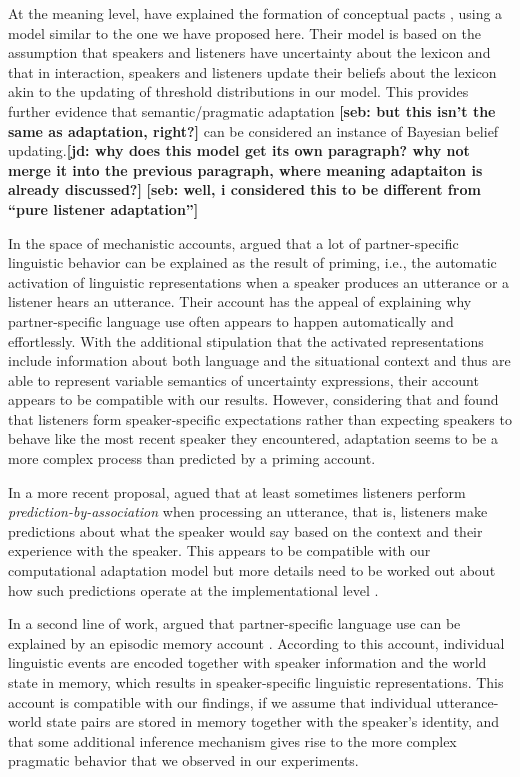 \documentclass[man, floatsintext]{apa6}
\newcommand{\jd}[1]{\textcolor{PinkyPurple}{\textbf{[jd: #1]}}}
\newcommand{\seb}[1]{}
\renewcommand{\seb}[1]{{\bf \color{red} [seb: {#1}]}}
\begin{document}
At the meaning level, \textcite{Hawkins2017} have explained the formation of conceptual pacts \parencite{Clark1986},
 using a model  similar to the one we have proposed here. 
Their model is based on the assumption that speakers and listeners have uncertainty 
about the lexicon \parencite[see also][]{Bergen2016} and that in interaction, speakers 
and listeners update their beliefs about the lexicon akin to the updating of threshold distributions 
in our model. %
This provides further evidence that semantic/pragmatic adaptation \seb{but this isn't the same as adaptation, right?} can be considered an instance of Bayesian belief updating.\jd{why does this model get its own paragraph? why not merge it into the previous paragraph, where meaning adaptaiton is already discussed?} \seb{well, i considered this to be different from ``pure listener adaptation''}

In the space of mechanistic accounts, \textcite{Pickering2004} argued that a lot of partner-specific linguistic behavior
 can be explained as the result of priming, i.e., the automatic activation of linguistic representations when 
a speaker produces an utterance or a listener hears an utterance. Their account has the appeal
of explaining why partner-specific language use often appears to happen automatically and effortlessly. 
With the additional stipulation that the activated representations include information about both language
and the situational context and thus are able to represent variable semantics of uncertainty expressions,
their account appears to be compatible with our results. However, considering that \textcite{Yildirim2016} and 
\textcite{Schuster2019} found that listeners form speaker-specific expectations rather than expecting speakers
to behave like the most recent speaker they encountered, adaptation seems to be a more complex process than predicted by a
priming account.

In a more recent proposal, \textcite{Pickering2013} agued that
at least sometimes listeners perform \textit{prediction-by-association} when processing
an utterance, that is, listeners make predictions about what the speaker would say based on
the context and their experience with the speaker.  This appears to
be compatible with our computational adaptation model but more details need to be
worked out about how such predictions operate at the implementational level \parencite{Marr1982}.

In a second line of work, \textcite{Horton2005,Horton2016} argued that partner-specific
language use can be explained by an episodic memory account \parencite{Goldinger1998,Johnson1997,Pierrehumbert2001}.
According to this account, individual linguistic events are encoded together with
speaker information and the world state in memory, which results in speaker-specific
linguistic representations. This account is compatible with our findings, if we assume
that individual utterance-world state pairs are stored in memory together with the speaker's 
identity, and that some additional inference mechanism gives rise to the more complex
pragmatic behavior that we observed in our experiments.
\end{document}
